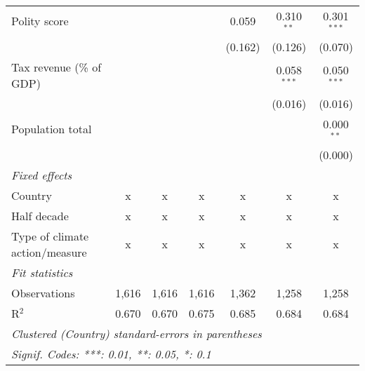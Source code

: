 \begin{tabular}{lcccccc}
   Polity score                                                      &         &         &                & 0.059          & 0.310$^{**}$   & 0.301$^{***}$\\   
                                                                     &         &         &                & (0.162)        & (0.126)        & (0.070)\\   
   Tax revenue (\% of GDP)                                           &         &         &                &                & 0.058$^{***}$  & 0.050$^{***}$\\   
                                                                     &         &         &                &                & (0.016)        & (0.016)\\   
   Population total                                                  &         &         &                &                &                & 0.000$^{**}$\\   
                                                                     &         &         &                &                &                & (0.000)\\   
   \emph{Fixed effects}\\
   Country                                                           & x       & x       & x              & x              & x              & x\\  
   Half decade                                                       & x       & x       & x              & x              & x              & x\\  
   Type of climate action/measure                                    & x       & x       & x              & x              & x              & x\\  
   \midrule \emph{Fit statistics}\\
   Observations                                                      & 1,616   & 1,616   & 1,616          & 1,362          & 1,258          & 1,258\\  
   R$^2$                                                             & 0.670   & 0.670   & 0.675          & 0.685          & 0.684          & 0.684\\  
   \midrule
   \multicolumn{7}{l}{\emph{Clustered (Country) standard-errors in parentheses}}\\
   \multicolumn{7}{l}{\emph{Signif. Codes: ***: 0.01, **: 0.05, *: 0.1}}\\
\end{tabular}
\par\endgroup


